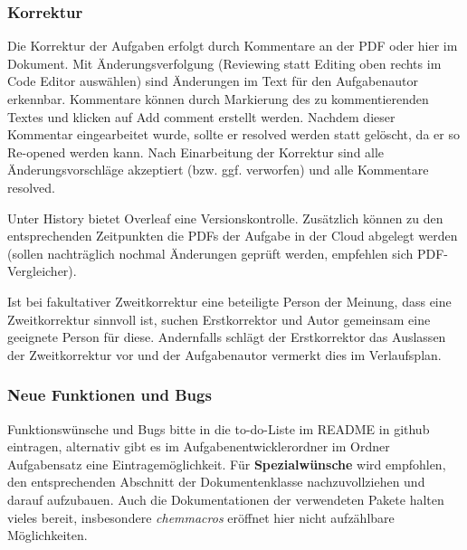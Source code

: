 \documentclass[../main.tex]{subfiles}
\begin{document}
\subsubsection{Korrektur}
Die Korrektur der Aufgaben erfolgt durch Kommentare an der PDF oder hier im Dokument. Mit \"Anderungsverfolgung (Reviewing statt Editing oben rechts im Code Editor auswählen) sind \"Anderungen im Text f\"ur den Aufgabenautor erkennbar. Kommentare können durch Markierung des zu kommentierenden Textes und klicken auf \glqq Add comment\grqq{}  erstellt werden. Nachdem dieser Kommentar eingearbeitet wurde, sollte er resolved werden statt gelöscht, da er so Re-opened werden kann. Nach Einarbeitung der Korrektur sind alle \"Anderungsvorschläge akzeptiert (bzw. ggf. verworfen) und alle Kommentare resolved. \par
Unter \glqq History\grqq{} bietet Overleaf eine Versionskontrolle. Zus\"atzlich k\"onnen zu den entsprechenden Zeitpunkten die PDFs der Aufgabe in der Cloud abgelegt werden (sollen nachtr\"aglich nochmal \"Anderungen gepr\"uft werden, empfehlen sich PDF-Vergleicher). \par
Ist bei fakultativer Zweitkorrektur eine beteiligte Person der Meinung, dass eine Zweitkorrektur sinnvoll ist, suchen Erstkorrektor und Autor gemeinsam eine geeignete Person f\"ur diese. Andernfalls schl\"agt der Erstkorrektor das Auslassen der Zweitkorrektur vor und der Aufgabenautor vermerkt dies im Verlaufsplan. 

\subsubsection{Neue Funktionen und Bugs}
Funktionsw\"unsche und Bugs bitte in die to-do-Liste im README in github eintragen, alternativ gibt es im Aufgabenentwicklerordner im Ordner Aufgabensatz eine Eintragem\"oglichkeit.
F\"ur \textbf{Spezialw\"unsche} wird empfohlen, den entsprechenden Abschnitt der Dokumentenklasse nachzuvollziehen und darauf aufzubauen. Auch die Dokumentationen der verwendeten Pakete halten vieles bereit, insbesondere \textit{chemmacros} er\"offnet hier nicht aufz\"ahlbare M\"oglichkeiten. \par 
\newpage
\end{document}
